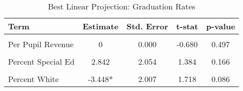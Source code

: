 \begin{table}[H]%
\centering
\caption{\label{tab:blp_afgr}Best Linear Projection: Graduation Rates}
\centering
\begin{tabular}[t]{lcccc}
\toprule
Term & Estimate & Std. Error & t-stat & p-value\\
\midrule
\cellcolor{gray!10}{(Intercept)} & \cellcolor{gray!10}{0.143**} & \cellcolor{gray!10}{0.058} & \cellcolor{gray!10}{2.474} & \cellcolor{gray!10}{0.013}\\
Per Pupil Revenue & 0 & 0.000 & -0.680 & 0.497\\
\cellcolor{gray!10}{Percent Hispanic} & \cellcolor{gray!10}{2.833} & \cellcolor{gray!10}{2.924} & \cellcolor{gray!10}{0.969} & \cellcolor{gray!10}{0.333}\\
Percent Special Ed & 2.842 & 2.054 & 1.384 & 0.166\\
\cellcolor{gray!10}{Teacher Salary} & \cellcolor{gray!10}{0} & \cellcolor{gray!10}{0.000} & \cellcolor{gray!10}{0.563} & \cellcolor{gray!10}{0.573}\\
Percent White & -3.448* & 2.007 & 1.718 & 0.086\\
\bottomrule
\end{tabular}
\end{table}
